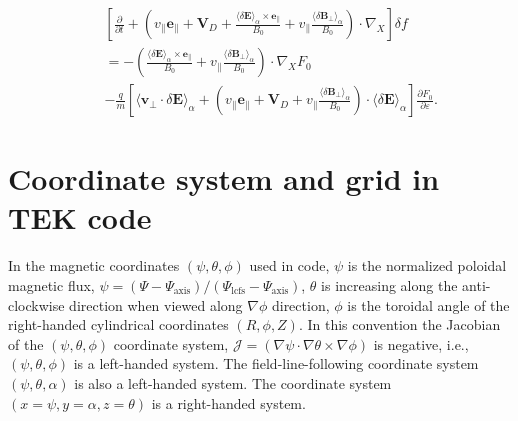 \documentclass{article}
\newcommand{\tmop}[1]{\ensuremath{\operatorname{#1}}}
\newcommand{\tmtexttt}[1]{\text{{\ttfamily{#1}}}}
\begin{document}
\begin{eqnarray}
  &  & \left[ \frac{\partial}{\partial t} + \left( v_{\parallel}
  \mathbf{e}_{\parallel} +\mathbf{V}_D + \frac{ \langle \delta \mathbf{E}
  \rangle_{\alpha} \times \mathbf{e}_{\parallel}}{B_0} + v_{\parallel}
  \frac{\langle \delta \mathbf{B}_{\perp} \rangle_{\alpha}}{B_0} \right) \cdot
  \nabla_X \right] \delta f \nonumber\\
  &  & = - \left( \frac{ \langle \delta \mathbf{E} \rangle_{\alpha} \times
  \mathbf{e}_{\parallel}}{B_0} + v_{\parallel} \frac{\langle \delta
  \mathbf{B}_{\perp} \rangle_{\alpha}}{B_0} \right) \cdot \nabla_X F_0
  \nonumber\\
  &  & - \frac{q}{m} \left[ \langle \mathbf{v}_{\perp} \cdot \delta
  \mathbf{E} \rangle_{\alpha} + \left( v_{\parallel} \mathbf{e}_{\parallel}
  +\mathbf{V}_D + v_{\parallel} \frac{\langle \delta \mathbf{B}_{\perp}
  \rangle_{\alpha}}{B_0} \right) \cdot \langle \delta \mathbf{E}
  \rangle_{\alpha} \right] \frac{\partial F_0}{\partial \varepsilon} . 
  \label{18-8-26-2}
\end{eqnarray}

\section{Coordinate system and grid in TEK code}

In the magnetic coordinates $(\psi, \theta, \phi)$ used in \tmtexttt{TEK}
code, $\psi$ is the normalized poloidal magnetic flux, $\psi = (\Psi -
\Psi_{\tmop{axis}}) / (\Psi_{\tmop{lcfs}} - \Psi_{\tmop{axis}})$, $\theta$ is
increasing along the anti-clockwise direction when viewed along $\nabla \phi$
direction, $\phi$ is the toroidal angle of the right-handed cylindrical
coordinates $(R, \phi, Z)$. In this convention the Jacobian of the $(\psi,
\theta, \phi)$ coordinate system, $\mathcal{J} = (\nabla \psi \cdot \nabla
\theta \times \nabla \phi)$ is negative, i.e., $(\psi, \theta, \phi)$ is a
left-handed system. The field-line-following coordinate system $(\psi, \theta,
\alpha)$ is also a left-handed system. The coordinate system $(x = \psi, y =
\alpha, z = \theta)$ is a right-handed system.
\end{document}
